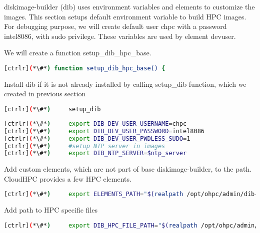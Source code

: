 
	diskimage-builder (dib) uses environment variables and elements to customize the images. This section setups default environment variable to build HPC images. For debugging purpose, we will create default user chpc with a password intel8086, with sudo privilege. These variables are used by element devuser. 

	We will create a function setup\_dib\_hpc\_base.

\begin{lstlisting}[language=bash,keywords={}]
[ctrlr](*\#*) function setup_dib_hpc_base() {
\end{lstlisting}

	Install dib if it is not already installed by calling setup\_dib function, which we created in previous section

\begin{lstlisting}[language=bash,keywords={}]
[ctrlr](*\#*)     setup_dib
\end{lstlisting}

\begin{lstlisting}[language=bash,keywords={}]
[ctrlr](*\#*)     export DIB_DEV_USER_USERNAME=chpc
[ctrlr](*\#*)     export DIB_DEV_USER_PASSWORD=intel8086
[ctrlr](*\#*)     export DIB_DEV_USER_PWDLESS_SUDO=1
[ctrlr](*\#*)     #setup NTP server in images
[ctrlr](*\#*)     export DIB_NTP_SERVER=$ntp_server
\end{lstlisting}

	Add custom elements, which are not part of base diskimage-builder, to the path. CloudHPC provides a few HPC elements. 

\begin{lstlisting}[language=bash,keywords={}]
[ctrlr](*\#*)     export ELEMENTS_PATH="$(realpath /opt/ohpc/admin/dib-chpc/elements/)"
\end{lstlisting}

	Add path to HPC specific files 

\begin{lstlisting}[language=bash,keywords={}]
[ctrlr](*\#*)     export DIB_HPC_FILE_PATH="$(realpath /opt/ohpc/admin/dib-chpc/hpc-files/)"
\end{lstlisting}

